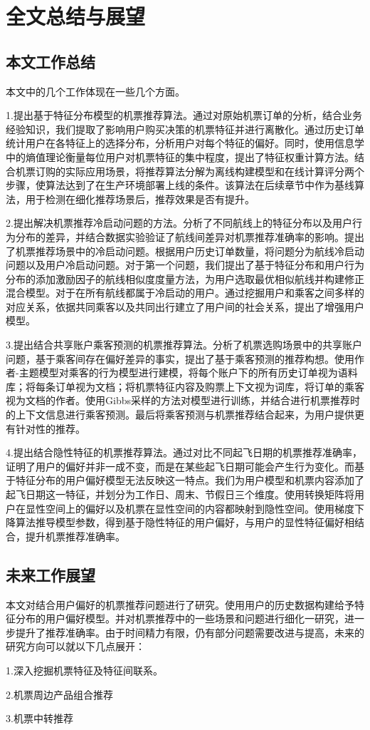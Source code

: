 
\chapter{全文总结与展望}
\label{chap:summary}

\section{本文工作总结}
本文中的几个工作体现在一些几个方面。

1.提出基于特征分布模型的机票推荐算法。通过对原始机票订单的分析，结合业务经验知识，我们提取了影响用户购买决策的机票特征并进行离散化。通过历史订单统计用户在各特征上的选择分布，分析用户对每个特征的偏好。同时，使用信息学中的熵值理论衡量每位用户对机票特征的集中程度，提出了特征权重计算方法。结合机票订购的实际应用场景，将推荐算法分解为离线构建模型和在线计算评分两个步骤，使算法达到了在生产环境部署上线的条件。该算法在后续章节中作为基线算法，用于检测在细化推荐场景后，推荐效果是否有提升。

2.提出解决机票推荐冷启动问题的方法。分析了不同航线上的特征分布以及用户行为分布的差异，并结合数据实验验证了航线间差异对机票推荐准确率的影响。提出了机票推荐场景中的冷启动问题。根据用户历史订单数量，将问题分为航线冷启动问题以及用户冷启动问题。对于第一个问题，我们提出了基于特征分布和用户行为分布的添加激励因子的航线相似度度量方法，为用户选取最优相似航线并构建修正混合模型。对于在所有航线都属于冷启动的用户。通过挖掘用户和乘客之间多样的对应关系，依据共同乘客以及共同出行建立了用户间的社会关系，提出了增强用户模型。

3.提出结合共享账户乘客预测的机票推荐算法。分析了机票选购场景中的共享账户问题，基于乘客间存在偏好差异的事实，提出了基于乘客预测的推荐构想。使用作者-主题模型对乘客的行为模型进行建模，将每个账户下的所有历史订单视为语料库；将每条订单视为文档；将机票特征内容及购票上下文视为词库，将订单的乘客视为文档的作者。使用Gibbs采样的方法对模型进行训练，并结合进行机票推荐时的上下文信息进行乘客预测。最后将乘客预测与机票推荐结合起来，为用户提供更有针对性的推荐。

4.提出结合隐性特征的机票推荐算法。通过对比不同起飞日期的机票推荐准确率，证明了用户的偏好并非一成不变，而是在某些起飞日期可能会产生行为变化。而基于特征分布的用户偏好模型无法反映这一特点。我们为用户模型和机票内容添加了起飞日期这一特征，并划分为工作日、周末、节假日三个维度。使用转换矩阵将用户在显性空间上的偏好以及机票在显性空间的内容都映射到隐性空间。使用梯度下降算法推导模型参数，得到基于隐性特征的用户偏好，与用户的显性特征偏好相结合，提升机票推荐准确率。

\section{未来工作展望}

本文对结合用户偏好的机票推荐问题进行了研究。使用用户的历史数据构建给予特征分布的用户偏好模型。并对机票推荐中的一些场景和问题进行细化一研究，进一步提升了推荐准确率。由于时间精力有限，仍有部分问题需要改进与提高，未来的研究方向可以就以下几点展开：

1.深入挖掘机票特征及特征间联系。

2.机票周边产品组合推荐

3.机票中转推荐
